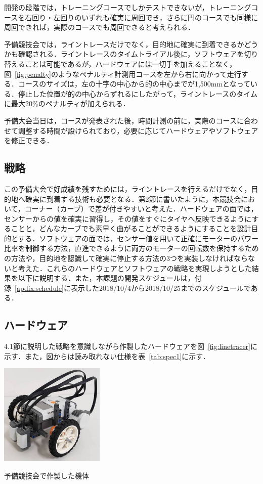 \begin{multicols*}{2}
開発の段階では，トレーニングコースでしかテストできないが，トレーニングコースを右回り・左回りのいずれも確実に周回でき，さらに円のコースでも同様に周回できれば，実際のコースでも周回できると考えられる．

予備競技会では，ライントレースだけでなく，目的地に確実に到着できるかどうかも確認される．ライントレースのタイムトライアル後に，ソフトウェアを切り替えることは可能であるが，ハードウェアには一切手を加えることなく，図~\ref{fig:penalty}のようなペナルティ計測用コースを左から右に向かって走行する．コースのサイズは，左の十字の中心から的の中心までが1,500mmとなっている．停止した位置が的の中心からずれるにしたがって，ライントレースのタイムに最大20\%のペナルティが加えられる．

予備大会当日は，コースが発表された後，時間計測の前に，実際のコースに合わせて調整する時間が設けられており，必要に応じてハードウェアやソフトウェアを修正できる．

\subsection{戦略}
この予備大会で好成績を残すためには，ライントレースを行えるだけでなく，目的地へ確実に到着する技術も必要となる．第2節に書いたように，本競技会において，コーナー（カーブ）で差が付きやすいと考えた．ハードウェアの面では，センサーからの値を確実に習得し，その値をすぐにタイヤへ反映できるようにすることと，どんなカーブでも素早く曲がることができるようにすることを設計目的とする．ソフトウェアの面では，センサー値を用いて正確にモーターのパワー比率を制御する方法，直進できるように両方のモーターの回転数を保持するための方法や，目的地を認識して確実に停止する方法の3つを実装しなければならないと考えた．これらのハードウェアとソフトウェアの戦略を実現しようとした結果を以下に説明する．また，本課題の開発スケジュールは，付録~\ref{apdix:schedule}に表示した2018/10/4から2018/10/25までのスケジュールである．

\subsection{ハードウェア}%
4.1節に説明した戦略を意識しながら作製したハードウェアを図~\ref{fig:linetracer}に示す．また，図からは読み取れない仕様を表~\ref{tab:spec1}に示す．

\begin{figurehere}
  \centering
  \includegraphics[width=5cm]{img/linetracer.jpg}
  \caption{予備競技会で作製した機体} \label{fig:linetracer}
\end{figurehere}


\end{multicols*}
